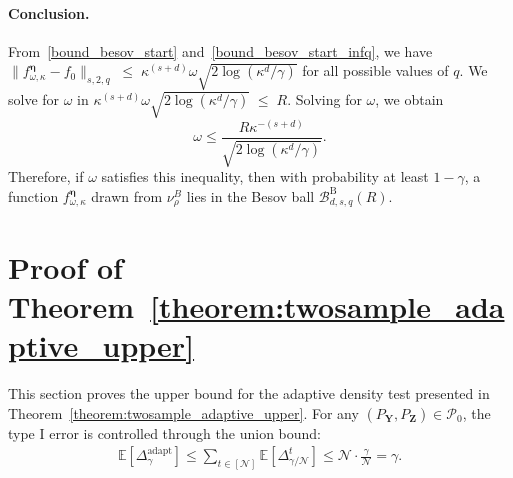 \documentclass[twoside,11pt]{article}
\newcommand{\distClassGeneric}{\mathcal{P}}
\newcommand{\rvTwo}{Y}
\newcommand{\rvThree}{Z}
\newcommand{\vectorize}[1]{\mathbf{#1}}
\newcommand{\adaptiveBinNumIndex}{t}
\newcommand{\dimDensity}{d} %
\newcommand{\smoothness}{s}
\newcommand{\ballRadius}{R}
\newcommand{\nTest}{\mathcal{N}} %
\newcommand{\maxErrorTypeOne}{\gamma} %
\newcommand{\binNum}{\kappa}           %
\newcommand{\besovParamMicroscope}{q}
\newcommand{\adaptiveSingleTest}[1]{\Delta^{#1}}
\newcommand{\ballDistn}{\mathcal{B}}
\newcommand{\besovBall}[2]{\ballDistn_{\dimDensity,\smoothness, #2}^{\mathrm{B}}(\ballRadius)}
\newcommand{\hypoNull}{\distClassGeneric_0}
\begin{document}
\begin{appendix}
	\paragraph{Conclusion.} 
	From~\eqref{bound_besov_start} and~\eqref{bound_besov_start_infq},
	we have
	$
	\|f^{{\boldsymbol{\eta}}}_{\omega, \binNum}
	-
	f_0\|_{
		\smoothness,
		2,
		\besovParamMicroscope
	}
	\;
	\leq
	\;
	\binNum^{(\smoothness + \dimDensity)}
	\omega
	\sqrt{
		2\log(\binNum^\dimDensity/\maxErrorTypeOne)
	}
	$
	for all possible values of $\besovParamMicroscope$.
	We solve for \(\omega\) in
	$
	\binNum^{(\smoothness + \dimDensity)}
	\omega
	\sqrt{
		2\log(\binNum^\dimDensity/\maxErrorTypeOne)
	}
	\;
	\leq
	\;
	\ballRadius.
	$
	Solving for $\omega$, we obtain
	\begin{equation}
		\omega \leq
		\frac{\ballRadius \binNum^{-(\smoothness + \dimDensity)}}{
			\sqrt{
				2\log(\binNum^\dimDensity/\maxErrorTypeOne)
			}
		}.
	\end{equation}
	Therefore, if \(\omega\) satisfies this inequality, then with probability at least \(1 - \gamma\),  a function \(f^{{\boldsymbol{\eta}}}_{\omega, \binNum}\) drawn from \(\nu_\rho^B\) lies in the Besov ball $\besovBall{}{\besovParamMicroscope}$.
	
	\section{Proof of Theorem~\ref{theorem:twosample_adaptive_upper}}\label{proof:twosample_adaptive}
	This section proves the upper bound for the adaptive  density test  presented in Theorem~\ref{theorem:twosample_adaptive_upper}. For any $(P_{\vectorize{\rvTwo}}, P_{\vectorize{\rvThree}}) \in \hypoNull$, the type I error is controlled through the union bound:
	\begin{align*}
		\mathbb{E}
		[	\Delta^{\text{adapt}}_{\maxErrorTypeOne}]
		\leq
		\sum_{{\adaptiveBinNumIndex} \in [\nTest]}
		\mathbb{E}
		[
		\adaptiveSingleTest{\adaptiveBinNumIndex}_{\maxErrorTypeOne/\nTest}
		]
		\leq
		\nTest \cdot \frac{\gamma}{\nTest} = \gamma.
	\end{align*}
	

\end{appendix}
\end{document}

